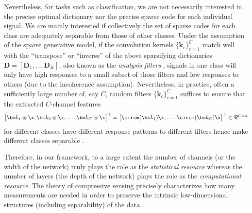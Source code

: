 \documentclass[../../book-main.tex]{subfiles}
\begin{document}
Nevertheless, for tasks such as classification, we are not
necessarily interested in the precise optimal dictionary nor the
precise sparse code for each individual signal. We are mainly
interested if collectively the set of sparse codes for each class are
adequately separable from those of other classes. Under the
assumption of the sparse generative model, if the convolution kernels
$\{\bm k_c\}_{c=1}^C$  match well with the ``transpose'' or
``inverse'' of the above sparsifying dictionaries $\bm D = [\bm D_1,
\ldots, \bm D_K]$, also known as the {\em analysis filters}
\cite{Cosparse-Nam,Analysis-Filter}, signals in one class will only
have high responses to a small subset of those filters and low
responses to others (due to the incoherence assumption).
Nevertheless, in practice, often a sufficiently large number of, say
$C$, random filters $\{\bm k_c\}_{c=1}^C$ suffices to ensure that the
extracted $C$-channel features
\begin{equation}
    \big[\bm k_1 \circledast \x, \bm k_2 \circledast \x, \ldots, \bm
    k_C \circledast \x\big]^\top = \big[\circm(\bm k_1) \x, \ldots,
    \circm(\bm k_C) \x \big]^\top \in \Re^{C\times d}
\end{equation}
for different classes have different response patterns to different
filters hence make different classes separable \cite{chan2015pcanet}.

Therefore, in our framework, to a large extent the number of channels
(or the width of the network) truly plays the role as the  {\em
statistical resource} whereas the number of layers (the depth of the
network) plays the role as the {\em computational resource}. The
theory of compressive sensing precisely characterizes how many
measurements are needed in order to preserve the intrinsic
low-dimensional structures (including separability) of the data
\cite{Wright-Ma-2022}. %
\end{document}
